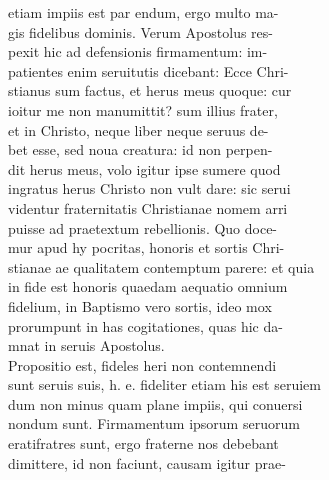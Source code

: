 \documentclass{article}
\begin{document}
\begin{pages}
                etiam impiis est par endum, ergo multo ma- \\
                gis fidelibus dominis. Verum Apostolus res- \\
                pexit hic ad defensionis firmamentum: im- \\
                patientes enim seruitutis dicebant: Ecce Chri- \\
                stianus sum factus, et herus meus quoque: cur \\
                ioitur me non manumittit? sum illius frater, \\
                et in Christo, neque liber neque seruus de- \\
                bet esse, sed noua creatura: id non perpen- \\
                dit herus meus, volo igitur ipse sumere quod \\
                ingratus herus Christo non vult dare: sic serui \\
                videntur fraternitatis Christianae nomem arri \\
                puisse ad praetextum rebellionis. Quo doce- \\
                mur apud hy pocritas, honoris et sortis Chri- \\
                stianae ae qualitatem contemptum parere: et quia \\
                in fide est honoris quaedam aequatio omnium \\
                fidelium, in Baptismo vero sortis, ideo mox \\
                prorumpunt in has cogitationes, quas hic da- \\
                mnat in seruis Apostolus. \\
                Propositio est, fideles heri non contemnendi \\
                sunt seruis suis, h. e. fideliter etiam his est seruiem \\
                dum non minus quam plane impiis, qui conuersi \\
                nondum sunt. Firmamentum ipsorum seruorum \\
                eratifratres sunt, ergo fraterne nos debebant \\
                dimittere, id non faciunt, causam igitur prae- \\

\end{pages}
\end{document}
